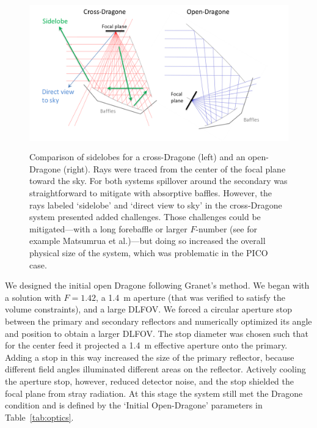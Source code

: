 \documentclass[]{spie}  %
\begin{document}
\begin{figure} [ht]
\begin{center}
\includegraphics[height=6.5cm]{sidelobes.png}
\end{center}
\caption { \label{fig:sidelobes} 
Comparison of sidelobes for a cross-Dragone (left) and an open-Dragone (right).  
Rays were traced from the center of the focal plane toward the sky.
For both systems spillover around the secondary was straightforward to mitigate with absorptive baffles.  
However, the rays labeled `sidelobe' and `direct view to 
sky' in the cross-Dragone system presented added challenges. Those challenges could be mitigated---with a long forebaffle or larger $F$-number (see
for example Matsumrua et al.\cite{LB2016_optics})---but
doing so increased the overall physical size of the system, which was problematic in the PICO case.}
\end{figure} 

We designed the initial open Dragone following Granet's method\cite{granet2001}. 
We began with a solution with $F=1.42$, a 1.4~m aperture (that was verified to satisfy the volume constraints), and a large 
DLFOV.  We forced a circular aperture stop 
between the primary and secondary reflectors and numerically optimized its angle and position to obtain 
a larger DLFOV.  The stop diameter was chosen such that for the center feed it projected a 
1.4~m effective aperture onto the primary. 
Adding a stop in this way increased the size of the primary reflector, because 
different field angles illuminated different areas on the reflector.
Actively cooling the aperture stop, however, reduced detector noise, and the stop shielded the 
focal plane from stray radiation. At this stage the system still met 
the Dragone condition and is defined by the `Initial Open-Dragone' parameters in Table~\ref{tab:optics}.
\end{document}
